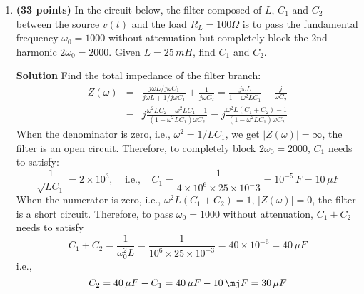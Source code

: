 \begin{enumerate}
\begin{enumerate}

  {\bf Solution} The total admittance is
  \begin{eqnarray}
    Y(\omega)&=&\frac{1}{j\omega L+1/j\omega C}+j\omega C_0
    =\frac{j\omega C}{1-\omega^2LC}+j\omega C_0
    =\frac{j\omega C+j\omega C_0(1-\omega^2LC)}{1-\omega^2LC}
    \nonumber
  \end{eqnarray}
  \begin{itemize}
    \item The magnitude of $Y(\omega)$ is minimized to zero if
      \[
      j\omega C+j\omega C_0(1-\omega^2LC)=0
      \]
      i.e.,
      \[
      \omega^2=\frac{C+C_0}{L(CC_0)},\;\;\;\;\;\mbox{or}
      \;\;\;\;\omega=\frac{1}{\sqrt{LC_p}}
      \]
      where 
      \[ 
      C_p=C||C_0=\frac{CC_0}{C+C_0}
      \]
      This is the parallel resonant frequency.
    \item The magnitude of $Y(\omega)$ is maximized to infinity if
      $\omega=1/\sqrt{LC}$ and the denominator becomes zero. This is
      the series resonant frequency.
  \end{itemize}


\item {\bf (33 points)} 
  In the circuit below, the filter composed of $L$, $C_1$ and $C_2$
  between the source $v(t)$ and the load $R_L=100\Omega$ is to pass the 
  fundamental frequency $\omega_0=1000$ without attenuation but completely 
  block the 2nd harmonic $2\omega_0=2000$. Given $L=25\,mH$, find $C_1$
  and $C_2$.


  {\bf Solution} Find the total impedance of the filter branch:
  \begin{eqnarray}
    Z(\omega)&=&\frac{j\omega L/j\omega C_1}{j\omega L+1/j\omega C_1}+\frac{1}{j\omega C_2}
    =\frac{j\omega L}{1-\omega^2LC_1}-\frac{j}{\omega C_2}
    \nonumber\\
    &=&j\frac{\omega^2LC_2+\omega^2LC_1-1}{(1-\omega^2LC_1)\omega C_2}
    =j\frac{\omega^2L(C_1+C_2)-1}{(1-\omega^2LC_1)\omega C_2}
    \nonumber
  \end{eqnarray}
  When the denominator is zero, i.e., $\omega^2=1/LC_1$, we get 
  $|Z(\omega)|=\infty$, the filter is an open circuit. Therefore, to 
  completely block $2\omega_0=2000$, $C_1$ needs to satisfy:
  \[
  \frac{1}{\sqrt{LC_1}}=2\times 10^3,\;\;\;\;\mbox{i.e.,}\;\;\;\;
  C_1=\frac{1}{4\times 10^6 \times 25\times 10^-3}=10^{-5}\,F=10\,\mu F
  \]
  When the numerator is zero, i.e., $\omega^2L(C_1+C_2)=1$,  $|Z(\omega)|=0$,
  the filter is a short circuit. Therefore, to pass $\omega_0=1000$ without
  attenuation, $C_1+C_2$ needs to satisfy
  \[
  C_1+C_2=\frac{1}{\omega_0^2L}=\frac{1}{10^6\times 25\times 10^{-3}}=40\times 10^{-6}=40\,\mu F
  \]
  i.e.,
  \[
  C_2=40\,\mu F-C_1=40\,\mu F-10\,\mj F=30\,\mu F
  \]


\end{enumerate}
\end{enumerate}
